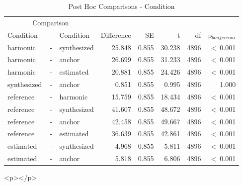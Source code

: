 \documentclass[a4paper,man,hidelinks,floatsintext]{apa7}
\begin{document}
    
\begin{table}[!htbp]
\caption{Post Hoc Comparisons - Condition}
\label{tab:Table_6}
\begin{adjustbox}{max size={\columnwidth}{\textheight}}
\centering
\begin{tabular}{lrlrrrrr}
\hline
\multicolumn{3}{c}{Comparison} & \multicolumn{5}{c}{~} \\
\cline{1-3}
Condition   & ~ & Condition   & Difference &    SE &      t &   df & p$_{bonferroni}$ \\
\hline
harmonic    & - & synthesized &     25.848 & 0.855 & 30.238 & 4896 &  \textless~0.001 \\
harmonic    & - & anchor      &     26.699 & 0.855 & 31.233 & 4896 &  \textless~0.001 \\
harmonic    & - & estimated   &     20.881 & 0.855 & 24.426 & 4896 &  \textless~0.001 \\
synthesized & - & anchor      &      0.851 & 0.855 &  0.995 & 4896 &            1.000 \\
reference   & - & harmonic    &     15.759 & 0.855 & 18.434 & 4896 &  \textless~0.001 \\
reference   & - & synthesized &     41.607 & 0.855 & 48.672 & 4896 &  \textless~0.001 \\
reference   & - & anchor      &     42.458 & 0.855 & 49.667 & 4896 &  \textless~0.001 \\
reference   & - & estimated   &     36.639 & 0.855 & 42.861 & 4896 &  \textless~0.001 \\
estimated   & - & synthesized &      4.968 & 0.855 &  5.811 & 4896 &  \textless~0.001 \\
estimated   & - & anchor      &      5.818 & 0.855 &  6.806 & 4896 &  \textless~0.001 \\
\hline
\end{tabular}
\end{adjustbox}
\begin{tablenotes} {
\small
}
\end{tablenotes}
\end{table}
      
        <p></p>
      
\end{document}
